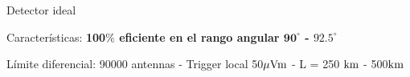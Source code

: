 \begin{frame}{Detector ideal}
\footnotesize
		\begin{alertblock}{Caracter\'isticas:}
		 \centering
		 \textbf{100$\bm\%$ eficiente en el rango angular $\bm{90^\circ}$ - $\bm{92.5^\circ}$}
		\end{alertblock}

		\begin{block}{\scriptsize L\'imite diferencial: 90000 antennas - Trigger local 50${\rm \mu Vm}$ - L = 250 ${\rm km}$ - 500${\rm km}$}
			\begin{center}
			\end{center}
		\end{block}
\end{frame}